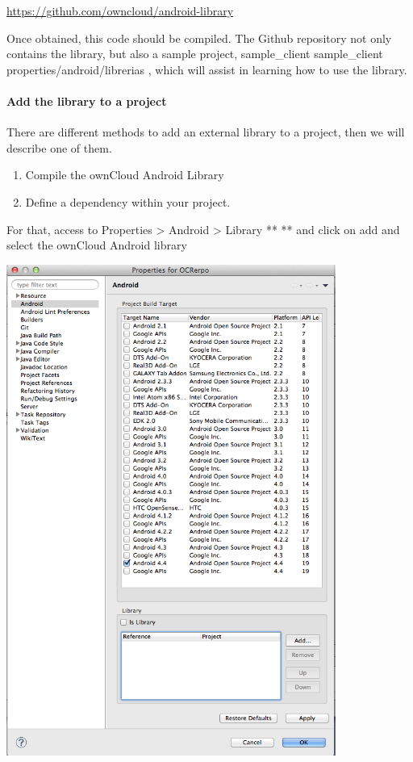 \documentclass[letterpaper,10pt,english]{sphinxmanual}
\begin{document}
\href{https://github.com/owncloud/android-library}{https://github.com/owncloud/android-library}

Once obtained, this code should be compiled. The Github repository not only contains the library, but also a sample project, sample\_client
sample\_client  properties/android/librerias
, which will assist in learning how to use the library.


\paragraph{Add the library to a project}
\label{android_library/library_installation:add-the-library-to-a-project}
There are different methods to add an external library to a project, then we will describe one of them.
\begin{enumerate}
\item {} 
Compile the ownCloud Android Library

\item {} 
Define a dependency within your project.

\end{enumerate}

For that, access to
Properties \textgreater{} Android \textgreater{} Library
** **
and click on add and select the ownCloud Android library

\includegraphics[width=10.795cm,height=16.106cm]{1000000000000270000003A317117674.png}
\end{document}
